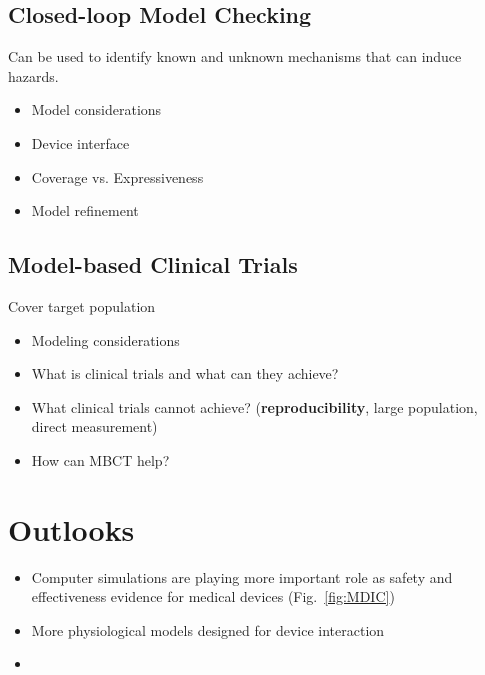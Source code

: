 \documentclass[a4paper]{article}
\newcommand{\figref}[1]{Fig.~\ref{fig:#1}}
\begin{document}
\subsection{Closed-loop Model Checking}
Can be used to identify known and unknown mechanisms that can induce hazards.
\begin{itemize}
	\item  Model considerations
	\item Device interface
	\item Coverage vs. Expressiveness
	\item Model refinement
\end{itemize}

\subsection{Model-based Clinical Trials}
Cover target population

\begin{itemize}
	\item Modeling considerations
	\item What is clinical trials and what can they achieve?
	\item What clinical trials cannot achieve? (\textbf{reproducibility}, large population, direct measurement)
	\item How can MBCT help?
\end{itemize}
\section{Outlooks}

\begin{itemize}
	\item Computer simulations are playing more important role as safety and effectiveness evidence for medical devices (\figref{MDIC})
	\item More physiological models designed for device interaction
	\item 
\end{itemize}



\end{document}
